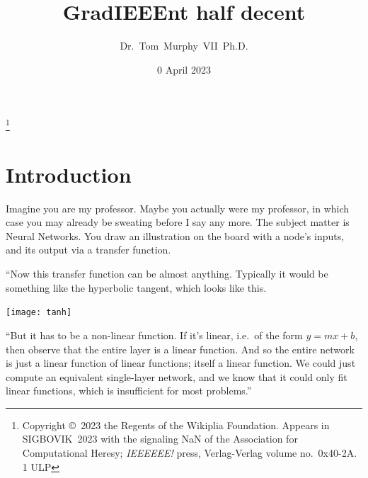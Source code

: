 \documentclass[twocolumn]{article}
\begin{document}
\title{GradIEEEnt half decent}
\author{Dr.~Tom~Murphy~VII~Ph.D.}\thanks{
Copyright \copyright\ 2023 the Regents of the Wikiplia Foundation.
Appears in SIGBOVIK~2023 with the
signaling NaN
of the Association for Computational Heresy; {\em IEEEEEE!}
press, Verlag-Verlag volume no.~0x40-2A. 1 ULP
}

\renewcommand\th{\ensuremath{{}^{\textrm{th}}}}
\newcommand\st{\ensuremath{{}^{\textrm{st}}}}
\newcommand\rd{\ensuremath{{}^{\textrm{rd}}}}
\newcommand\nd{\ensuremath{{}^{\textrm{nd}}}}

\newcommand\gradone{{\sf grad1}}
\newcommand\downshifttwo{{\sf downshift2}}
\newcommand\plussixtyfour{{\sf plus64}}

\renewcommand\paragraph[1]{\smallskip \noindent{\bf #1}\enspace}

\date{0 April 2023}

\maketitle \thispagestyle{empty}

\sloppypar


\section{Introduction}



Imagine you are my professor. Maybe you actually were my professor, in
which case you may already be sweating before I say any more. The
subject matter is Neural Networks. You draw an illustration on the
board with a node's inputs, and its output via a transfer function.

\smallskip
``Now this transfer function can be almost anything. Typically it
would be something like the hyperbolic tangent, which looks like this.

\begin{center}
\texttt{[image: tanh]}
\end{center}

\smallskip
``But it has to be a non-linear function. If it's linear, i.e.~of the
form $y = mx + b$, then observe that the entire layer is a linear
function. And so the entire network is just a linear function of
linear functions; itself a linear function. We could just compute an
equivalent single-layer network, and we know that it could only fit
linear functions, which is insufficient for most problems.''
\end{document}
